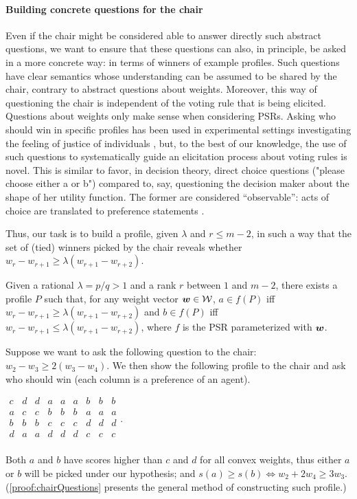 \documentclass{article}
\begin{document}
\paragraph{Building concrete questions for the chair}
Even if the chair might be considered able to answer directly such abstract questions, we want to ensure that these questions can also, in principle, be asked in a more concrete way: in terms of winners of example profiles. Such questions have clear semantics whose understanding can be assumed to be shared by the chair, contrary to abstract questions about weights. 
Moreover, this way of questioning the chair is independent of the voting rule that is being elicited. Questions about weights only make sense when considering PSRs.
Asking who should win in specific profiles has been used in experimental settings investigating the feeling of justice of individuals \citep{Giritligil2005}, but, to the best of our knowledge, the use of such questions to systematically guide an elicitation process about voting rules is novel. 
This is similar to favor, in decision theory, direct choice questions ("please choose either a or b") compared to, say, questioning the decision maker about the shape of her utility function. The former are considered “observable”: acts of choice are translated to preference statements \citep[Ch.\ 1]{colell_microeconomic_1995}. 

Thus, our task is to build a profile, given $\lambda$ and $r ≤ m-2$, in such a way that the set of (tied) winners picked by the chair reveals whether $w_{r} - w_{r+1} \geq \lambda (w_{r+1} - w_{r+2})$.
\begin{proposition}\label{prop:chairQuestions}
	Given a rational $\lambda = p/q > 1$ and a rank $r$ between $1$ and $m - 2$, there exists a profile $P$ such that, for any weight vector $\bm{w} \in \mathcal{W}$, $a \in f(P)$ iff $w_{r} - w_{r+1} ≥ \lambda (w_{r+1} - w_{r+2})$ and $b \in f(P)$ iff $w_{r} - w_{r+1} ≤ \lambda (w_{r+1} - w_{r+2})$, where $f$ is the PSR parameterized with $\bm{w}$.
\end{proposition}

\begin{example*}
	Suppose we want to ask the following question to the chair: $w_{2} - w_{3} ≥ 2 (w_{3} - w_{4})$. 
	We then show the following profile to the chair and ask who should win (each column is a preference of an agent).
	\begin{center}
		$
		\begin{array}{ccccccccc}
			c&d&d&a&a&a&b&b&b\\
			a&c&c&b&b&b&a&a&a\\
			b&b&b&c&c&c&d&d&d\\
			d&a&a&d&d&d&c&c&c\\
		\end{array}.
		$
	\end{center}
	Both $a$ and $b$ have scores higher than $c$ and $d$ for all convex weights, thus either $a$ or $b$ will be picked under our hypothesis; and $s(a) ≥ s(b) ⇔ w_2 + 2 w_4 ≥ 3 w_3$.
	(\cref{proof:chairQuestions} presents the general method of constructing such profile.)
\end{example*}
\end{document}
